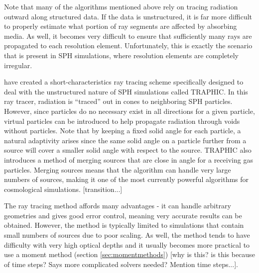 Note that many of the algorithms mentioned above rely on tracing radiation outward along structured data. If the data is unstructured, it is far more difficult to properly estimate what portion of ray segments are affected by absorbing media. As well, it becomes very difficult to ensure that sufficiently many rays are propagated to each resolution element. Unfortunately, this is exactly the scenario that is present in SPH simulations, where resolution elements are completely irregular.

\citet{pawlikSchaye} have created a short-characteristics ray tracing scheme specifically designed to deal with the unstructured nature of SPH simulations called TRAPHIC. In this ray tracer, radiation is ``traced'' out in cones to neighboring SPH particles. However, since particles do no necessary exist in all directions for a given particle, virtual particles can be introduced to help propagate radiation through voids without particles. Note that by keeping a fixed solid angle for each particle, a natural adaptivity arises since the same solid angle on a particle further from a source will cover a smaller solid angle with respect to the source. TRAPHIC also introduces a method of merging sources that are close in angle for a receiving gas particles. Merging sources means that the algorithm can handle very large numbers of sources, making it one of the most currently powerful algorithms for cosmological simulations. [transition...]

The ray tracing method affords many advantages - it can handle arbitrary geometries and gives good error control, meaning very accurate results can be obtained. However, the method is typically limited to simulations that contain small numbers of sources due to poor scaling. As well, the method tends to have difficulty with very high optical depths and it usually becomes more practical to use a moment method (section \ref{sec:momentmethods}) [why is this? is this because of time steps? Says more complicated solvers needed? Mention time steps...].


%

